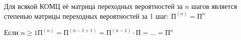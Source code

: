 \begin{sledsv}
  Для всякой КОМЦ её матрица переходных вероятностей за $n$ шагов является степенью матрицы переходных
  вероятностей за 1 шаг: $\text{П}^{(n)} = \text{П}^n$
  \begin{dokvo}
    Если $n \geqslant 1 \text{П}^{(n)} = \text{П}^{(n-1+1)} = \text{П}^{(n-1)}\cdot\text{П} = \ldots = \text{П}^n$
  \end{dokvo}
\end{sledsv}
\newpage
